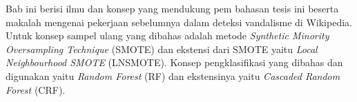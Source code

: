 Bab ini berisi ilmu dan konsep yang mendukung pem bahasan tesis ini beserta
makalah mengenai pekerjaan sebelumnya dalam deteksi vandalisme di Wikipedia.
Untuk konsep sampel ulang yang dibahas adalah metode \textit{Synthetic Minority
Oversampling Technique} (SMOTE) dan ekstensi dari SMOTE yaitu
\textit{Local Neighbourhood SMOTE} (LNSMOTE).
Konsep pengklasifikasi yang dibahas dan digunakan yaitu \textit{Random Forest}
(RF) dan ekstensinya yaitu \textit{Cascaded Random Forest} (CRF).
